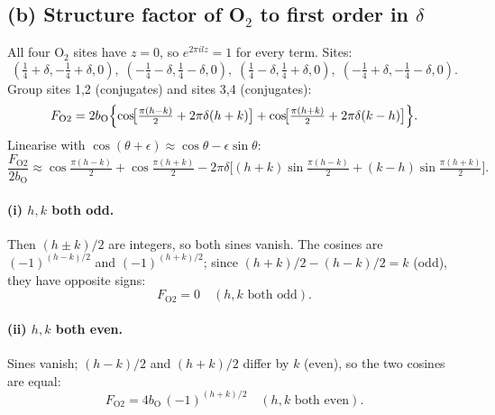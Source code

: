 \documentclass[11pt]{article}
\begin{document}
\subsection*{(b) Structure factor of O$_2$ to first order in $\delta$}

All four O$_2$ sites have $z=0$, so $e^{2\pi i l z}=1$ for every term. Sites:
\begin{equation}
(\tfrac14+\delta,-\tfrac14+\delta,0),\;(-\tfrac14-\delta,\tfrac14-\delta,0),\;(\tfrac14-\delta,\tfrac14+\delta,0),\;(-\tfrac14+\delta,-\tfrac14-\delta,0).
\end{equation}
Group sites 1,2 (conjugates) and sites 3,4 (conjugates):
\begin{equation}
F_{\mathrm{O2}}=2b_{\mathrm{O}}\Bigl\{\cos\!\bigl[\tfrac{\pi(h-k)}{2}+2\pi\delta(h+k)\bigr]+\cos\!\bigl[\tfrac{\pi(h+k)}{2}+2\pi\delta(k-h)\bigr]\Bigr\}.
\label{eq:Fo2-exact}
\end{equation}
Linearise with $\cos(\theta+\epsilon)\approx\cos\theta-\epsilon\sin\theta$:
\begin{equation}
\frac{F_{\mathrm{O2}}}{2b_{\mathrm{O}}}\approx\cos\!\tfrac{\pi(h-k)}{2}+\cos\!\tfrac{\pi(h+k)}{2}-2\pi\delta\bigl[(h+k)\sin\!\tfrac{\pi(h-k)}{2}+(k-h)\sin\!\tfrac{\pi(h+k)}{2}\bigr].
\label{eq:Fo2-lin}
\end{equation}

\paragraph{(i) $h,k$ both odd.} Then $(h\pm k)/2$ are integers, so both sines vanish. The cosines are $(-1)^{(h-k)/2}$ and $(-1)^{(h+k)/2}$; since $(h+k)/2 - (h-k)/2 = k$ (odd), they have opposite signs:
\begin{equation}
\boxed{\,F_{\mathrm{O2}}=0\quad(h,k\text{ both odd}).\,}
\label{eq:Fo2-oddodd}
\end{equation}

\paragraph{(ii) $h,k$ both even.} Sines vanish; $(h-k)/2$ and $(h+k)/2$ differ by $k$ (even), so the two cosines are equal:
\begin{equation}
\boxed{\,F_{\mathrm{O2}}=4b_{\mathrm{O}}\,(-1)^{(h+k)/2}\quad(h,k\text{ both even}).\,}
\label{eq:Fo2-eveneven}
\end{equation}
\end{document}
